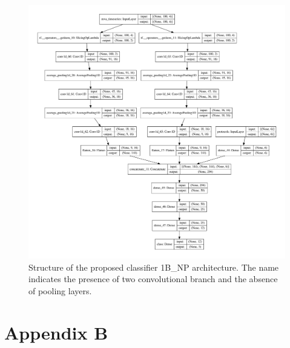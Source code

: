 \begin{figure}
    \hspace{-2cm}\includegraphics[width=1.3\textwidth]{images/models/model_2bnp.pdf}
\caption{{Structure of the proposed classifier 1B\_NP architecture. The name indicates the presence of two convolutional branch and the absence of pooling layers.}}    \label{fig:2bnp_model}
\end{figure}




\chapter{Appendix B}
\lipsum[1]
\label{app:lb_bonus_res}
